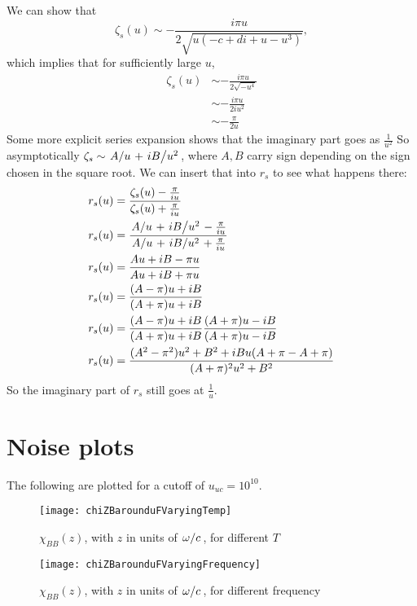 \documentclass[../main.tex]{subfiles}
\begin{document}
	We can show that
	\begin{equation}
		\zeta_s(u) \sim - \frac{i \pi u}{2 \sqrt{u\left( - c + di + u - u^3 \right)}},
	\end{equation}
	which implies that for sufficiently large $u$,
	\begin{align}
		\zeta_s(u) &\sim - \frac{i \pi u}{2 \sqrt{- u^4}} \\
		&\sim - \frac{i \pi u}{2 i u^2} \\
		&\sim - \frac{\pi }{2 u}
	\end{align}
	Some more explicit series expansion shows that the imaginary part goes as $\frac{1}{u^2}$
	So asymptotically $\zeta_s \sim \flatfrac{A}{u} + \flatfrac{i B}{u^2}$, where $A, B$ carry sign depending on the sign chosen in the square root.
	We can insert that into $r_s$ to see what happens there:
	\begin{align}
		r_s(u) &= \frac{\zeta_s(u) - \frac{\pi}{iu }}{\zeta_s(u) + \frac{\pi}{iu}} \\
		r_s(u) &= \frac{\flatfrac{A}{u} + \flatfrac{i B}{u^2} - \frac{\pi}{iu}}{\flatfrac{A}{u} + \flatfrac{i B}{u^2} + \frac{\pi}{iu}} \\
		r_s(u) &= \frac{A u + i B - \pi u}{A u + i B + \pi u} \\
		r_s(u) &= \frac{(A - \pi) u + i B}{(A + \pi)u + i B } \\
		r_s(u) &= \frac{(A - \pi) u + i B}{(A + \pi)u + i B } \frac{{(A + \pi)u - i B }}{{(A + \pi)u - i B }} \\
		r_s(u) &= \frac{(A^2 - \pi^2) u^2 + B^2  + i B u(A + \pi - A + \pi)}{(A + \pi)^2 u^2 + B^2 }
	\end{align}
	So the imaginary part of $r_s$ still goes at $\frac{1}{u}$.


	\section{Noise plots} \label{sec:plots}

	The following are plotted for a cutoff of $u_{uc} = 10^{10}$.

	\begin{figure}[htp]
		\centering
		\texttt{[image: chiZBarounduFVaryingTemp]}
		\caption{$\chi_{BB}(z)$, with $z$ in units of $\flatfrac{\omega}{c}$, for different $T$} \label{fig:temp}
	\end{figure}

	\begin{figure}[htp]
		\centering
		\texttt{[image: chiZBarounduFVaryingFrequency]}
		\caption{$\chi_{BB}(z)$, with $z$ in units of $\flatfrac{\omega}{c}$, for different frequency} \label{fig:frequency}
	\end{figure}
\end{document}
